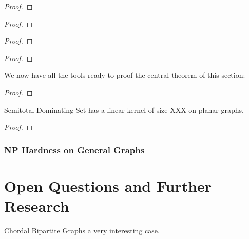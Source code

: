 \begin{proof} 
\end{proof}

\begin{lemma}
    
\end{lemma}
\begin{proof} 
\end{proof}

\begin{lemma}
    
\end{lemma}
\begin{proof} 
\end{proof}

\begin{lemma}
    
\end{lemma}
\begin{proof} 
\end{proof}

We now have all the tools ready to proof the central theorem of this section: 

\begin{lemma}
    
\end{lemma}
\begin{proof} 
\end{proof}

\begin{theorem}
    Semitotal Dominating Set has a linear kernel of size XXX on planar graphs.
\end{theorem}
\begin{proof} 
\end{proof}

\subsection*{NP Hardness on General Graphs}

\chapter{Open Questions and Further Research}

Chordal Bipartite Graphs a very interesting case.